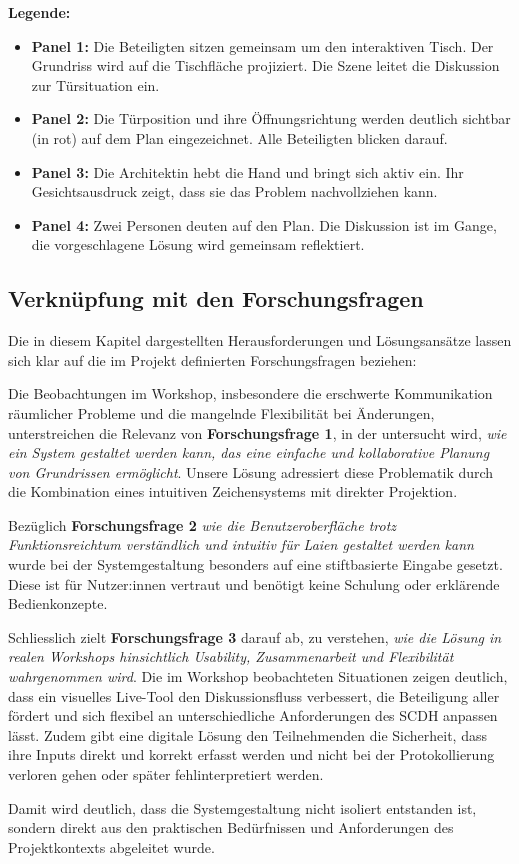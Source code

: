 \textbf{Legende:}
\begin{itemize}
    \item \textbf{Panel 1:} Die Beteiligten sitzen gemeinsam um den interaktiven Tisch. Der Grundriss wird auf die Tischfläche projiziert. Die Szene leitet die Diskussion zur Türsituation ein.
    \item \textbf{Panel 2:} Die Türposition und ihre Öffnungsrichtung werden deutlich sichtbar (in rot) auf dem Plan eingezeichnet. Alle Beteiligten blicken darauf.
    \item \textbf{Panel 3:} Die Architektin hebt die Hand und bringt sich aktiv ein. Ihr Gesichtsausdruck zeigt, dass sie das Problem nachvollziehen kann.
    \item \textbf{Panel 4:} Zwei Personen deuten auf den Plan. Die Diskussion ist im Gange, die vorgeschlagene Lösung wird gemeinsam reflektiert.
\end{itemize}


\clearpage


\subsection{Verknüpfung mit den Forschungsfragen}

Die in diesem Kapitel dargestellten Herausforderungen und Lösungsansätze lassen sich klar auf die im Projekt definierten Forschungsfragen beziehen:

Die Beobachtungen im Workshop, insbesondere die erschwerte Kommunikation räumlicher Probleme und die mangelnde Flexibilität bei Änderungen, unterstreichen die Relevanz von \textbf{Forschungsfrage 1}, in der untersucht wird, \textit{wie ein System gestaltet werden kann, das eine einfache und kollaborative Planung von Grundrissen ermöglicht}. Unsere Lösung adressiert diese Problematik durch die Kombination eines intuitiven Zeichensystems mit direkter Projektion.

Bezüglich \textbf{Forschungsfrage 2} \textit{wie die Benutzeroberfläche trotz Funktionsreichtum verständlich und intuitiv für Laien gestaltet werden kann} wurde bei der Systemgestaltung besonders auf eine stiftbasierte Eingabe gesetzt. Diese ist für Nutzer:innen vertraut und benötigt keine Schulung oder erklärende Bedienkonzepte.

Schliesslich zielt \textbf{Forschungsfrage 3} darauf ab, zu verstehen, \textit{wie die Lösung in realen Workshops hinsichtlich Usability, Zusammenarbeit und Flexibilität wahrgenommen wird}. Die im Workshop beobachteten Situationen zeigen deutlich, dass ein visuelles Live-Tool den Diskussionsfluss verbessert, die Beteiligung aller fördert und sich flexibel an unterschiedliche Anforderungen des SCDH anpassen lässt. Zudem gibt eine digitale Lösung den Teilnehmenden die Sicherheit, dass ihre Inputs direkt und korrekt erfasst werden und nicht bei der Protokollierung verloren gehen oder später fehlinterpretiert werden.

Damit wird deutlich, dass die Systemgestaltung nicht isoliert entstanden ist, sondern direkt aus den praktischen Bedürfnissen und Anforderungen des Projektkontexts abgeleitet wurde.

